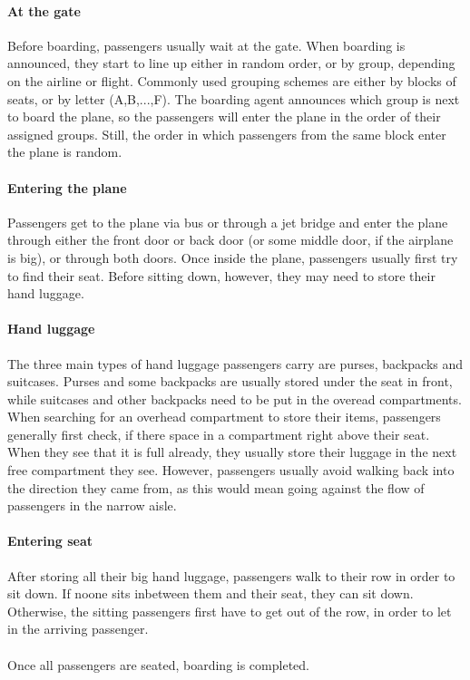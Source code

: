 \documentclass[11pt]{article}
\begin{document}
\paragraph{At the gate}
Before boarding, passengers usually wait at the gate. When boarding is announced, they start to line up either in random order, or by group, depending on the airline or flight. Commonly used grouping schemes are either by blocks of seats, or by letter (A,B,...,F). The boarding agent announces which group is next to board the plane, so the passengers will enter the plane in the order of their assigned groups. Still, the order in which passengers from the same block enter the plane is random. 

\paragraph{Entering the plane}
Passengers get to the plane via bus or through a jet bridge and enter the plane through either the front door or back door (or some middle door, if the airplane is big), or through both doors. Once inside the plane, passengers usually first try to find their seat.  Before sitting down, however, they may need to store their hand luggage. 
\paragraph{Hand luggage} The three main types of hand luggage passengers carry are purses, backpacks and suitcases. Purses and some backpacks are usually stored under the seat in front, while suitcases and other backpacks need to be put in the overead compartments. When searching for an overhead compartment to store their items, passengers generally first check, if there space in a compartment right above their seat. When they see that it is full already, they usually store their luggage in the next free compartment they see. However, passengers usually avoid walking back into the direction they came from, as this would mean going against the flow of passengers in the narrow aisle.

\paragraph{Entering seat} After storing all their big hand luggage, passengers walk to their row in order to sit down. If noone sits inbetween them and their seat, they can sit down. Otherwise, the sitting passengers first have to get out of the row, in order to let in the arriving passenger.
\\\\
Once all passengers are seated, boarding is completed.
\end{document}
